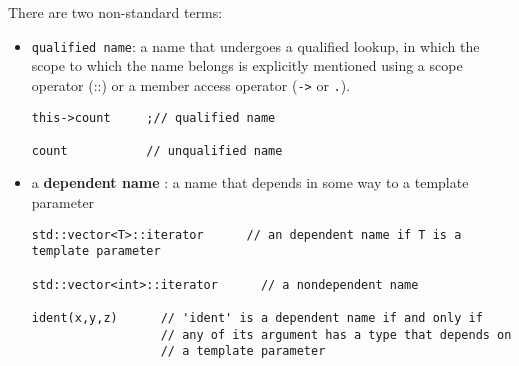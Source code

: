 There are two non-standard terms:
\begin{itemize}
  
   \item \verb!qualified name!: a name that undergoes a qualified lookup, in
   which the scope to which the name belongs is explicitly mentioned using a
   scope operator (::) or a member access operator (\verb!->! or \verb!.!).
   
\begin{verbatim}
this->count 	;// qualified name

count 			// unqualified name
\end{verbatim}
   
  

  \item a {\bf dependent name} : a name that depends in some way to a
  template parameter
\begin{verbatim}
std::vector<T>::iterator      // an dependent name if T is a template parameter

std::vector<int>::iterator      // a nondependent name

ident(x,y,z)      // 'ident' is a dependent name if and only if
                  // any of its argument has a type that depends on 
                  // a template parameter
\end{verbatim}
      
\end{itemize}


